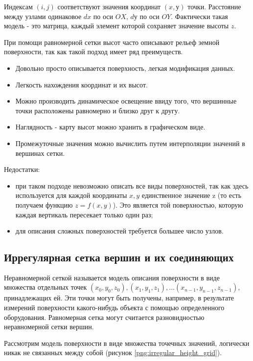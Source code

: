 Индексам $(i,j)$ соответствуют значения координат $(x, у)$ точки. Расстояние между узлами одинаковое $dx$ по оси $OX$, $dу$ по оси $OY$. Фактически такая модель - это матрица, каждый элемент которой сохраняет значение высоты $z$.

При помощи равномерной сетки высот часто описывают рельеф земной поверхности, так как такой подход имеет ряд преимуществ.
\begin{itemize}
	\item Довольно просто описывается поверхность, легкая модификация данных.
	\item Легкость нахождения координат и их высот.
	\item Можно производить динамическое освещение ввиду того, что вершинные точки расположены равномерно и близко друг к другу.
	\item Наглядность - карту высот можно хранить в графическом виде.
	\item Промежуточные значения можно вычислить путем интерполяции значений в вершинах сетки.
\end{itemize}

Недостатки:
\begin{itemize}
	\item при таком подходе невозможно описать все виды поверхностей, так как здесь используется для каждой координаты $x, y$ единственное значение z (то есть получаем функцию $z = f(x, y)$). Это является той поверхностью, которую каждая вертикаль пересекает только один раз;
	\item для описания сложных поверхностей требуется большее число узлов.
\end{itemize}

\subsection{Иррегулярная сетка вершин и их соединяющих}
Неравномерной сеткой называется модель описания поверхности в виде множества отдельных точек ${(x_{0}, y_{0}, z_{0}), (x_{1}, y_{1}, z_{1}), ... (x_{n-1}, y_{n-1}, z_{n-1})}$, принадлежащих ей. Эти точки могут быть получены, например, в результате измерений поверхности какого-нибудь объекта с помощью определенного оборудования. Равномерная сетка могут считается разновидностью неравномерной сетки вершин.

Рассмотрим модель поверхности в виде множества точечных значений, логически никак не связанных между собой (рисунок \ref{png:irregular_height_grid}). 
\begin{figure}[H]
\end{figure}

